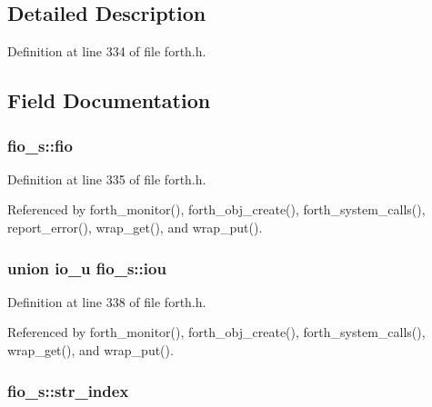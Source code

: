 \subsection{Detailed Description}


Definition at line 334 of file forth.\-h.



\subsection{Field Documentation}
\hypertarget{structfio__s_acbbc17cdfcfc9190ed0af199670fba33}{
\subsubsection[{fio}]{ fio\-\_\-s\-::fio}}\label{structfio__s_acbbc17cdfcfc9190ed0af199670fba33}


Definition at line 335 of file forth.\-h.



Referenced by forth\-\_\-monitor(), forth\-\_\-obj\-\_\-create(), forth\-\_\-system\-\_\-calls(), report\-\_\-error(), wrap\-\_\-get(), and wrap\-\_\-put().

\hypertarget{structfio__s_a3f24ec109b199f9500d313a19b62b304}{
\subsubsection[{iou}]{\setlength{\rightskip}{0pt plus 5cm}union {\bf io\-\_\-u} fio\-\_\-s\-::iou}}\label{structfio__s_a3f24ec109b199f9500d313a19b62b304}


Definition at line 338 of file forth.\-h.



Referenced by forth\-\_\-monitor(), forth\-\_\-obj\-\_\-create(), forth\-\_\-system\-\_\-calls(), wrap\-\_\-get(), and wrap\-\_\-put().

\hypertarget{structfio__s_a6a40f69645ccdcc90111dd97c9e98027}{
\subsubsection[{str\-\_\-index}]{ fio\-\_\-s\-::str\-\_\-index}}\label{structfio__s_a6a40f69645ccdcc90111dd97c9e98027}


